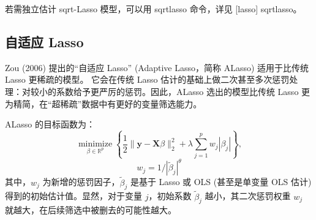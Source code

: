 若需独立估计 sqrt-Lasso 模型，可以用 sqrtlasso 命令，详见 [lasso] sqrtlasso。


%






\subsection{自适应 Lasso}\label{sec:adaptive-lasso}

Zou (2006) 提出的“自适应 Lasso” (Adaptive Lasso，简称 ALasso) 适用于比传统 Lasso 更稀疏的模型。%
它会在传统 Lasso 估计的基础上做二次甚至多次惩罚处理：对较小的系数给予更严厉的惩罚。因此，ALasso 选出的模型比传统 Lasso 更为精简，在“超稀疏”数据中有更好的变量筛选能力。

ALasso 的目标函数为：%
\begin{equation}\label{eq:lasso-ALasso-01}
	\underset{\beta \in \mathbb{R}^{p}}{\operatorname{minimize}}\left\{\frac{1}{2}\|\mathbf{y}-\mathbf{X} \beta\|_{2}^{2}+\lambda \sum_{j=1}^{p} w_{j}\left|\beta_{j}\right|\right\},
\end{equation}
$$w_{j}=1 / |\widetilde{\beta}_{j}|^{\theta}$$  
其中，$w_{j}$ 为新增的惩罚因子，$\widetilde{\beta}_{j}$ 是基于 Lasso 或 OLS (甚至是单变量 OLS 估计) 得到的初始估计值。显然，对于变量 $j$，初始系数 $\widetilde{\beta}_{j}$ 越小，其二次惩罚权重 $w_{j}$ 就越大，在后续筛选中被删去的可能性越大。

